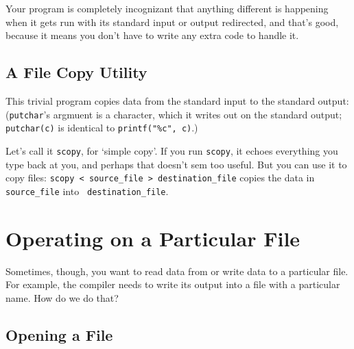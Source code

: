 Your program is completely incognizant that anything different is
happening when it gets run with its standard input or output redirected,
and that's good, because it means you don't have to write any extra code
to handle it.

\subsection{A File Copy Utility}

This trivial program copies data from the standard input to the standard
output: ({\tt putchar}'s argmuent is a character, which it writes out on
the standard output; {\tt putchar(c)} is identical to {\tt printf("\%c",
c)}.)

\begin{flushleft}
\verb% #include <stdio.h>% \\*
\verb% % \\*
\verb% int main(void)% \\*
\verb% { % \\*
\verb%   int c;% \\*
\verb% % \\*
\verb%   while ((c = getchar()) != EOF)% \\*
\verb%     putchar(c);% \\*
\verb%   return 0;% \\*
\verb% }% \\*
\end{flushleft}

Let's call it {\tt scopy}, for `simple copy'.  If you run {\tt scopy},
it echoes everything you type back at you, and perhaps that doesn't sem
too useful.  But you can use it to copy files: {\tt scopy < source\_file
> destination\_file} copies the data in {\tt source\_file} into {\tt
destination\_file}.

\section{Operating on a Particular File}

Sometimes, though, you want to read data from or write data to a
particular file.  For example, the compiler needs to write its output
into a file with a particular name.  How do we do that?

\subsection{Opening a File}

